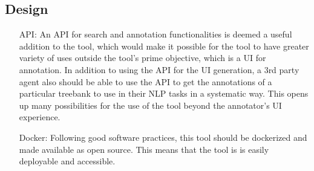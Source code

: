 \subsection{Design}
\begin{itemize}[before=\normalfont, font=\itshape, align=left]
\item[API:]
An API for search and annotation functionalities is deemed a useful addition to the tool, which would make it possible for the tool to have greater variety of uses outside the tool's prime objective, which is a UI for annotation.
In addition to using the API for the UI generation, a 3rd party agent also should be able to use the API to get the annotations of a particular treebank to use in their NLP tasks in a systematic way.
This opens up many possibilities for the use of the tool beyond the annotator's UI experience.

\item[Docker:]
Following good software practices, this tool should be dockerized and made available as open source.
This means that the tool is is easily deployable and accessible.
\end{itemize}
